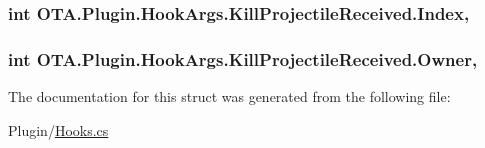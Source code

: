 \subsubsection[{Index}]{\setlength{\rightskip}{0pt plus 5cm}int O\+T\+A.\+Plugin.\+Hook\+Args.\+Kill\+Projectile\+Received.\+Index\hspace{0.3cm}{\ttfamily [get]}, {\ttfamily [set]}}\label{struct_o_t_a_1_1_plugin_1_1_hook_args_1_1_kill_projectile_received_a89c5bcd1ff4744bdade9b7d86b17e628}
\hypertarget{struct_o_t_a_1_1_plugin_1_1_hook_args_1_1_kill_projectile_received_acdb96a38df6c884769f68fec224d7b55}{}
\subsubsection[{Owner}]{\setlength{\rightskip}{0pt plus 5cm}int O\+T\+A.\+Plugin.\+Hook\+Args.\+Kill\+Projectile\+Received.\+Owner\hspace{0.3cm}{\ttfamily [get]}, {\ttfamily [set]}}\label{struct_o_t_a_1_1_plugin_1_1_hook_args_1_1_kill_projectile_received_acdb96a38df6c884769f68fec224d7b55}


The documentation for this struct was generated from the following file\+:\begin{DoxyCompactItemize}
\item 
Plugin/\hyperlink{_hooks_8cs}{Hooks.\+cs}\end{DoxyCompactItemize}
